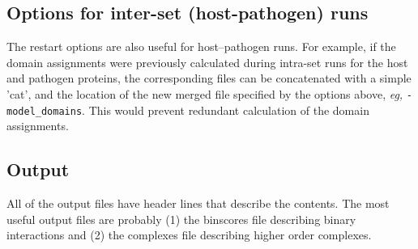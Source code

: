 \documentclass[11pt]{article}
\begin{document}
\subsection{Options for inter-set (host-pathogen) runs}
The restart options are also useful for host--pathogen runs. For example, if the domain assignments were previously calculated during intra-set runs for the host and pathogen proteins, the corresponding files can be concatenated with a simple 'cat', and the location of the new merged file specified by the options above, {\it eg,} {\tt -model\_domains}. This would prevent redundant calculation of the domain assignments.

\subsection{Output}
All of the output files have header lines that describe the contents. The most useful output files are probably (1) the binscores file describing binary interactions and (2) the complexes file describing higher order complexes.
\end{document}
